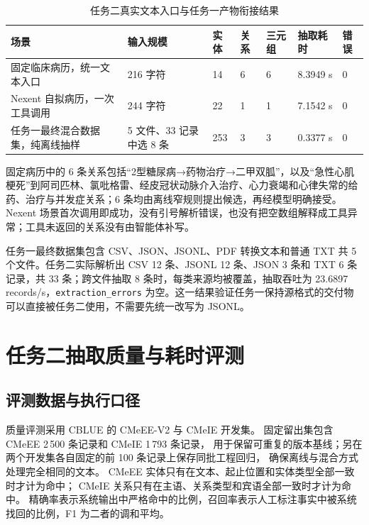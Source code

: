 \begin{table}[H]
\centering
\small
\caption{任务二真实文本入口与任务一产物衔接结果}
\label{tab:task2-runtime-text-flow}
\begin{tabularx}{\textwidth}{L{3.1cm}L{2.0cm}C{1.2cm}C{1.2cm}C{1.2cm}C{1.4cm}Y}
\toprule
\textbf{场景} & \textbf{输入规模} & \textbf{实体} & \textbf{关系} & \textbf{三元组} & \textbf{抽取耗时} & \textbf{错误} \\
\midrule
固定临床病历，统一文本入口 & 216 字符 & 14 & 6 & 6 & 8.3949 s & 0 \\
Nexent 自拟病历，一次工具调用 & 244 字符 & 22 & 1 & 1 & 7.1542 s & 0 \\
任务一最终混合数据集，纯离线抽样 & 5 文件、33 记录中选 8 条 & 253 & 3 & 3 & 0.3377 s & 0 \\
\bottomrule
\end{tabularx}
\end{table}

固定病历中的 6 条关系包括“2型糖尿病→药物治疗→二甲双胍”，以及“急性心肌梗死”到阿司匹林、氯吡格雷、经皮冠状动脉介入治疗、心力衰竭和心律失常的给药、治疗与并发症关系；6 条均由离线窄规则提出候选，再经模型明确接受。Nexent 场景首次调用即成功，没有引号解析错误，也没有把空数组解释成工具异常；工具未返回的关系没有由智能体补写。

任务一最终数据集包含 CSV、JSON、JSONL、PDF 转换文本和普通 TXT 共 5 个文件。任务二实际解析出 CSV 12 条、JSONL 12 条、JSON 3 条和 TXT 6 条记录，共 33 条；跨文件抽取 8 条时，每类来源均被覆盖，抽取吞吐为 23.6897 records/s，\texttt{extraction\_errors} 为空。这一结果验证任务一保持源格式的交付物可以直接被任务二使用，不需要先统一改写为 JSONL。

\section{任务二抽取质量与耗时评测}

\subsection{评测数据与执行口径}

质量评测采用 CBLUE 的 CMeEE-V2 与 CMeIE 开发集。
固定留出集包含 CMeEE 2\,500 条记录和 CMeIE 1\,793 条记录，
用于保留可重复的版本基线；另在两个开发集各自固定的前 100 条记录上保存同批工程回归，
确保离线与混合方式处理完全相同的文本。
CMeEE 实体只有在文本、起止位置和实体类型全部一致时才计为命中；
CMeIE 关系只有在主语、关系类型和宾语全部一致时才计为命中。
精确率表示系统输出中严格命中的比例，召回率表示人工标注事实中被系统找回的比例，F1 为二者的调和平均。

